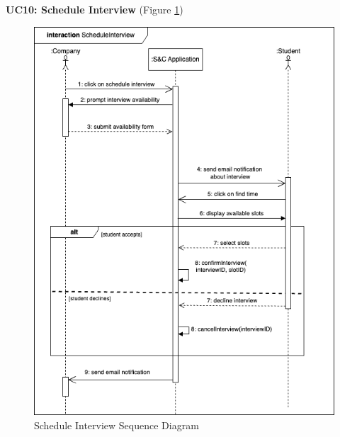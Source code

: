 \textbf{UC10: Schedule Interview} (Figure \ref{fig:schedule_sequence})
\begin{figure}[H]
\centering
\includegraphics[width=\textwidth]{Images/scheduleInterview-sequence.png}
\caption{\label{fig:schedule_sequence} Schedule Interview Sequence Diagram}
\end{figure}

